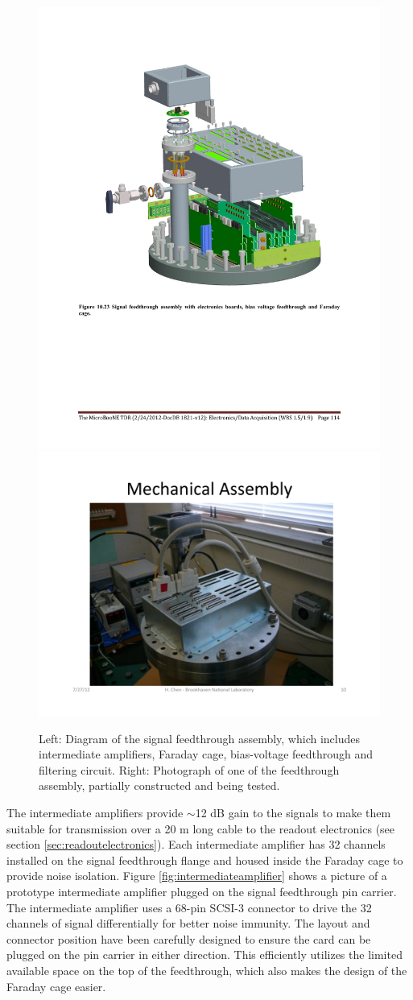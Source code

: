 \begin{figure}
\begin{center}
\includegraphics[width=0.4\linewidth]{figures/signal_feedthrough_assembly.pdf}
\includegraphics[width=0.4\linewidth]{figures/signal_feedthrough_assembly_photo.pdf}
\end{center}
\caption{\label{fig:feedthroughassembly}Left:  Diagram of the signal feedthrough assembly, which includes intermediate amplifiers, Faraday cage, bias-voltage feedthrough and filtering circuit.  Right: Photograph of one of the feedthrough assembly, partially constructed and being tested.}
\end{figure}

The intermediate amplifiers provide $\sim$12 dB gain to the \lartpc signals to make them suitable for transmission over a 20 m long cable to the readout electronics (see section \ref{sec:readoutelectronics}).  Each intermediate amplifier has 32 channels installed on the signal feedthrough flange and housed inside the Faraday cage to provide noise isolation. Figure \ref{fig:intermediateamplifier} shows a picture of a prototype intermediate amplifier plugged on the signal feedthrough pin carrier. The intermediate amplifier uses a 68-pin SCSI-3 connector to drive the 32 channels of signal differentially for better noise immunity. The layout and connector position have been carefully designed to ensure the card can be plugged on the pin carrier in either direction. This efficiently utilizes the limited available space on the top of the feedthrough, which also makes the design of the Faraday cage easier.

